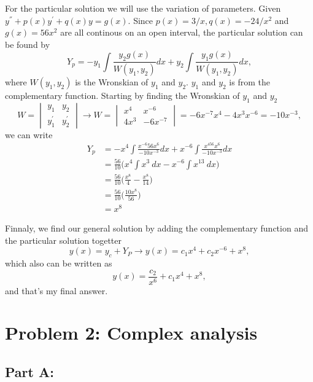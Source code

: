 \documentclass{article}
\begin{document}
For the particular solution we will use the variation of parameters. Given $y^{''} + p(x)y^{'} + q(x)y = g(x)$. Since $p(x) = 3/x, q(x) = -24/x^2$ and $g(x) = 56x^2$ are all continous on an open interval, the particular solution can be found by
\begin{equation}
Y_p = -y_1\int \frac{y_2g(x)}{W(y_1,y_2)}dx + y_2\int \frac{y_1g(x)}{W(y_1, y_2)}dx,
\end{equation}
where $W(y_1, y_2)$ is the Wronskian of $y_1$ and $y_2$. $y_1$ and $y_2$ is from the complementary function. Starting by finding the Wronskian of $y_1$ and $y_2$
\begin{equation}
W = \begin{vmatrix}y_1&y_2\\y_1^{'}&y_2^{'}\end{vmatrix} \rightarrow W = \begin{vmatrix}x^4&x^{-6}\\4x^3&-6x^{-7}\end{vmatrix} = -6x^{-7}x^4 - 4x^3x^{-6} = -10x^{-3},
\end{equation}
we can write
\begin{align}
Y_p &= -x^4 \int \frac{x^{-6}56x^6}{-10x^{-3}}dx + x^{-6} \int \frac{x^456x^6}{-10x^{-3}}dx \\
 &= \frac{56}{10}\bigg(x^4 \int x^3 \ dx - x^{-6} \int x^{13} \ dx \bigg) \\
 &= \frac{56}{10}\bigg(\frac{x^8}{4} - \frac{x^{8}}{14}\bigg) \\
 &= \frac{56}{10}\bigg(\frac{10x^8}{56}\bigg) \\
 &= x^8
\end{align}

Finnaly, we find our general solution by adding the complementary function and the particular solution togetter
\begin{equation}
y(x) = y_c + Y_P \rightarrow y(x) = c_1x^4 + c_2x^{-6} + x^8,
\end{equation}
which also can be written as
\begin{equation}
y(x) = \frac{c_2}{x^{6}} + c_1x^4 + x^8,
\end{equation}
and that's my final answer.

\section*{Problem 2: Complex analysis}

\subsection*{Part A:}
\end{document}
